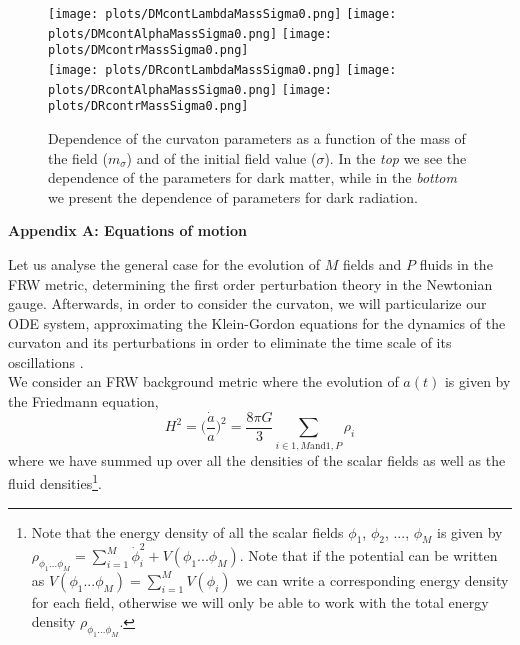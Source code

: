 \documentclass[11pt]{article}
\begin{document}
\newpage
\begin{multicols}{2}
\end{multicols}
\begin{figure*}
  \centering    
  \texttt{[image: plots/DMcontLambdaMassSigma0.png]}
  \texttt{[image: plots/DMcontAlphaMassSigma0.png]}
  \texttt{[image: plots/DMcontrMassSigma0.png]} \\
    \texttt{[image: plots/DRcontLambdaMassSigma0.png]}
  \texttt{[image: plots/DRcontAlphaMassSigma0.png]}
  \texttt{[image: plots/DRcontrMassSigma0.png]}
  \caption{Dependence of the curvaton parameters as a function of the mass of the field ($m_{\sigma}$) and of the initial field value ($\sigma$). In the \textit{top} we see the dependence of the parameters for dark matter, while in the \textit{bottom} we present the dependence of parameters for dark radiation. } 
\label{fig:masssigma}
\end{figure*}
\begin{multicols}{2}
\end{multicols}
\newpage
\begin{center}
{\Large \textbf{Appendix A: Equations of motion}}
\end{center}
\indent Let us analyse the general case for the evolution of $M$ fields and $P$ fluids in the FRW metric, determining the first order perturbation theory in the Newtonian gauge. Afterwards, in order to consider the curvaton, we will particularize our ODE system, approximating the Klein-Gordon equations for the dynamics of the curvaton and its perturbations in order to eliminate the time scale of its oscillations . \\
\indent We consider an FRW background metric where the evolution of $a(t)$ is given by the Friedmann equation, 
\begin{equation}
H^2 = \bigg(\frac{\dot a}{a} \bigg)^2 =  \frac{8 \pi G}3 \sum_{i \in {1,M} \mbox{and}  {1,P}} \rho_i 
\end{equation}
where we have summed up over all the densities of the scalar fields as well as the fluid densities\footnote{Note that the energy density of all the scalar fields $\phi_1$, $\phi_2$, ...,  $\phi_M$ is given by $\rho_{\phi_1 ... \phi_M} = \sum_{i=1}^M \dot \phi_i^2 + V(\phi_1 ... \phi_M) $. Note that if the potential can be written as $V(\phi_1 ... \phi_M) = \sum_{i=1}^M V(\phi_i)$ we can write a corresponding energy density for each field, otherwise we will only be able to work with the total energy density  $\rho_{\phi_1 ... \phi_M}$. }.\\
\end{document}
